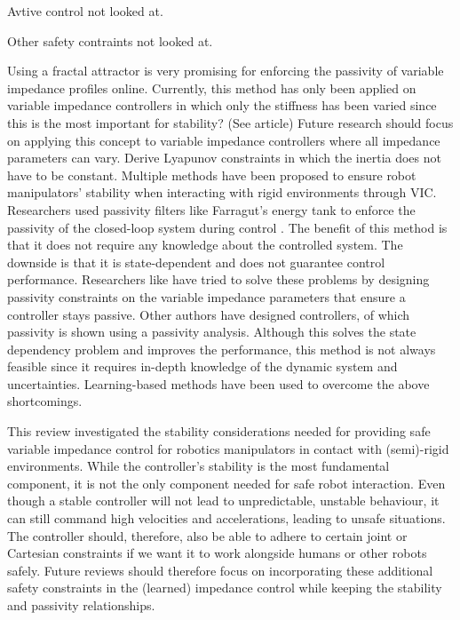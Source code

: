 Avtive control not looked at.

Other safety contraints not looked at.

Using a fractal attractor is very promising for enforcing the passivity of variable impedance profiles online. Currently, this method has only been applied on variable impedance controllers in which only the stiffness has been varied since this is the most important for stability? (See article) Future research should focus on applying this concept to variable impedance controllers where all impedance parameters can vary.
Derive Lyapunov constraints in which the inertia does not have to be constant.
Multiple methods have been proposed to ensure robot manipulators' stability when interacting with rigid environments through VIC. Researchers used passivity filters like Farragut's energy tank to enforce the passivity of the closed-loop system during control \cite{ferragutiTankbasedApproachImpedance2013}. The benefit of this method is that it does not require any knowledge about the controlled system. The downside is that it is state-dependent and does not guarantee control performance. Researchers like \cite{kronanderStabilityConsiderationsVariable2016}have tried to solve these problems by designing passivity constraints on the variable impedance parameters that ensure a controller stays passive. Other authors have designed controllers, of which passivity is shown using a passivity analysis. Although this solves the state dependency problem and improves the performance, this method is not always feasible since it requires in-depth knowledge of the dynamic system and uncertainties. Learning-based methods have been used to overcome the above shortcomings.

This review investigated the stability considerations needed for providing safe variable impedance control for robotics manipulators in contact with (semi)-rigid environments. While the controller's stability is the most fundamental component, it is not the only component needed for safe robot interaction. Even though a stable controller will not lead to unpredictable, unstable behaviour, it can still command high velocities and accelerations, leading to unsafe situations. The controller should, therefore, also be able to adhere to certain joint or Cartesian constraints if we want it to work alongside humans or other robots safely. Future reviews should therefore focus on incorporating these additional safety constraints in the (learned) impedance control while keeping the stability and passivity relationships.

